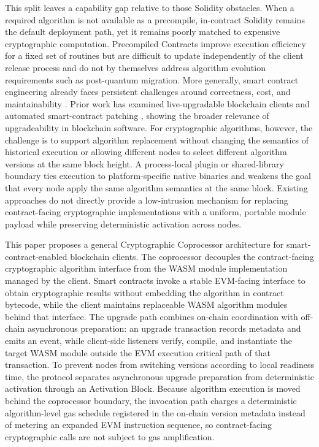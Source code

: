 \documentclass[pdflatex,sn-mathphys-num]{sn-jnl}%
\theoremstyle{thmstyleone}%
\theoremstyle{thmstyletwo}%
\theoremstyle{thmstylethree}%
\begin{document}
This split leaves a capability gap relative to those Solidity obstacles. When a required algorithm is not available as a precompile, in-contract Solidity remains the default deployment path, yet it remains poorly matched to expensive cryptographic computation. Precompiled Contracts improve execution efficiency for a fixed set of routines but are difficult to update independently of the client release process and do not by themselves address algorithm evolution requirements such as post-quantum migration. More generally, smart contract engineering already faces persistent challenges around correctness, cost, and maintainability \cite{zou2021smartContracts}. Prior work has examined live-upgradable blockchain clients and automated smart-contract patching \cite{wang2023phoenix,rodler2021evmpatch}, showing the broader relevance of upgradeability in blockchain software. For cryptographic algorithms, however, the challenge is to support algorithm replacement without changing the semantics of historical execution or allowing different nodes to select different algorithm versions at the same block height. A process-local plugin or shared-library boundary ties execution to platform-specific native binaries and weakens the goal that every node apply the same algorithm semantics at the same block. Existing approaches do not directly provide a low-intrusion mechanism for replacing contract-facing cryptographic implementations with a uniform, portable module payload while preserving deterministic activation across nodes.

This paper proposes a general Cryptographic Coprocessor architecture for smart-contract-enabled blockchain clients. The coprocessor decouples the contract-facing cryptographic algorithm interface from the WASM module implementation managed by the client. Smart contracts invoke a stable EVM-facing interface to obtain cryptographic results without embedding the algorithm in contract bytecode, while the client maintains replaceable WASM algorithm modules behind that interface. The upgrade path combines on-chain coordination with off-chain asynchronous preparation: an upgrade transaction records metadata and emits an event, while client-side listeners verify, compile, and instantiate the target WASM module outside the EVM execution critical path of that transaction. To prevent nodes from switching versions according to local readiness time, the protocol separates asynchronous upgrade preparation from deterministic activation through an Activation Block. Because algorithm execution is moved behind the coprocessor boundary, the invocation path charges a deterministic algorithm-level gas schedule registered in the on-chain version metadata instead of metering an expanded EVM instruction sequence, so contract-facing cryptographic calls are not subject to gas amplification.
\end{document}
